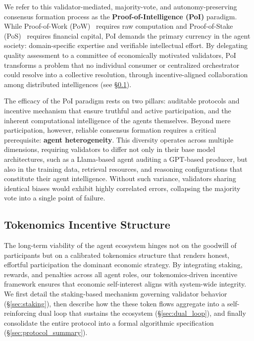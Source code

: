 We refer to this validator-mediated, majority-vote, and autonomy-preserving consensus formation process as the \textbf{Proof-of-Intelligence (PoI)} paradigm. While Proof-of-Work (PoW)~\cite{jakobsson1999proofs} requires raw computation and Proof-of-Stake (PoS)~\cite{dwork1992pricing} requires financial capital, PoI demands the primary currency in the agent society: domain-specific expertise and verifiable intellectual effort. By delegating quality assessment to a committee of economically motivated validators, PoI transforms a problem that no individual consumer or centralized orchestrator could resolve into a collective resolution, through incentive-aligned collaboration among distributed intelligences (see \S\ref{sec:tokenomics_loop}).

The efficacy of the PoI paradigm rests on two pillars: auditable protocols and incentive mechanism that ensure truthful and active participation, and the inherent computational intelligence of the agents themselves. Beyond mere participation, however, reliable consensus formation requires a critical prerequisite: \textbf{agent heterogeneity}. This diversity operates across multiple dimensions, requiring validators to differ not only in their base model architectures, such as a Llama-based agent auditing a GPT-based producer, but also in the training data, retrieval resources, and reasoning configurations that constitute their agent intelligence. Without such variance, validators sharing identical biases would exhibit highly correlated errors, collapsing the majority vote into a single point of failure.


\subsection{Tokenomics Incentive Structure}
\label{sec:tokenomics_loop}

The long-term viability of the agent ecosystem hinges not on the goodwill of participants but on a calibrated tokenomics structure that renders honest, effortful participation the dominant economic strategy. By integrating staking, rewards, and penalties across all agent roles, our tokenomics-driven incentive framework ensures that economic self-interest aligns with system-wide integrity. We first detail the staking-based mechanism governing validator behavior (\S\ref{sec:staking}), then describe how the these token flows aggregate into a self-reinforcing dual loop that sustains the ecosystem (\S\ref{sec:dual_loop}), and finally consolidate the entire protocol into a formal algorithmic specification (\S\ref{sec:protocol_summary}).

